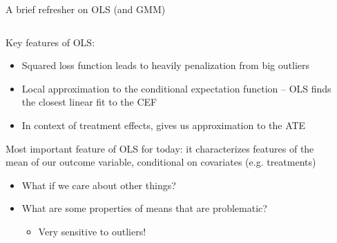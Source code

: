 \documentclass[notes,11pt, aspectratio=169]{beamer}
\newenvironment{wideitemize}{\itemize\addtolength{\itemsep}{10pt}}{\enditemize}
\begin{document}
\begin{frame}{A brief refresher on OLS (and GMM)}
  \begin{columns}[T] %
\begin{column}{.8\textwidth}
  \begin{wideitemize}
  \item Key features of OLS:
    \begin{itemize}
    \item Squared loss function leads to heavily penalization from big outliers
    \item Local approximation to the conditional expectation function
      -- OLS finds the closest linear fit to the CEF
    \item In context of treatment effects, gives us approximation to the
      ATE
    \end{itemize}
  \item Most important feature of OLS for today: it characterizes
    features of the mean of our outcome variable, conditional on
    covariates (e.g. treatments)
    \begin{itemize}
    \item What if we care about other things?
    \item What are some properties of means that are problematic?
      \begin{itemize}
      \item Very sensitive to outliers!
      \end{itemize}
    \end{itemize}
  \end{wideitemize}
  \end{column}%
  \hfill%
  \begin{column}{.5\textwidth}
  \end{column}
\end{columns}
\end{frame}
\end{document}
